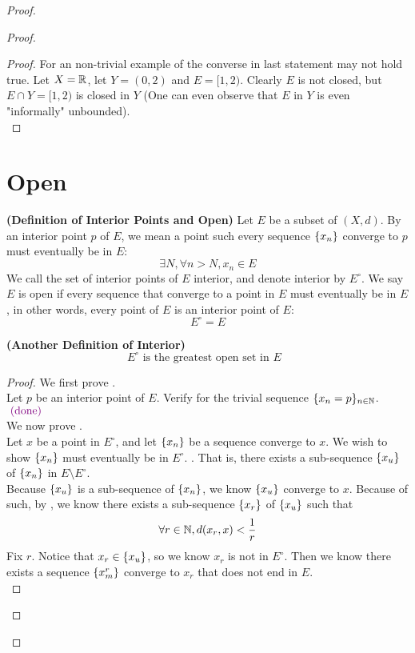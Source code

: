 \documentclass{report}
\begin{document}
\begin{proof}
\begin{proof}
\begin{proof}
For an non-trivial example of the converse in last statement may not hold true. Let $X=\mathbb{R}$, let $Y=(0,2)$ and $E=[1,2)$. Clearly $E$ is not closed, but  $E\cap Y=[1,2)$ is closed in $Y$ (One can even observe that $E$ in  $Y$ is even "informally" unbounded).\\
\end{proof}
\section{Open}
\begin{definition}
\label{3.3.1}
\textbf{(Definition of Interior Points and Open)} Let $E$ be a subset of $(X,d)$. By an interior point $p$ of $E$, we mean a point such every sequence  $\{ x_n \}$ converge to $p$ must eventually be in  $E$:
 \begin{equation}
\exists N, \forall n>N, x_n\in E
\end{equation}
We call the set of interior points of $E$  interior, and denote interior by  $E^\circ $. We say $E$ is open if every sequence that converge to a point in  $E$ must eventually be in  $E$, in other words, every point of $E$ is an interior point of $E$:
 \begin{equation}
E^\circ =E
\end{equation}
\end{definition}
\begin{theorem}
\label{3.3.2}
\textbf{(Another Definition of Interior)} 
\begin{equation}
E^\circ\text{ is the greatest open set in $E$ }
\end{equation}
\end{theorem}
\begin{proof}
We first prove .\\

Let $p$ be an interior point of $E$. Verify for the trivial sequence $\{ x_n=p \}_{n\in\mathbb{N}}$. $\textcolor{violet}{\text{ (done) }}$\\

We now prove .\\

Let $x$ be a point in $E^\circ $, and let $\{ x_n \}$ be a sequence converge to $x$. We wish to show  $\{ x_n \}$ must eventually be in $E^\circ $. . That is, there exists a sub-sequence $\{ x_u \}$ of $\{ x_n \}$ in $E\setminus E^\circ $.\\

Because $\{ x_u \}$ is a sub-sequence of $\{ x_n \}$, we know $\{ x_u \}$ converge to $x$. Because of such, by  , we know there exists a sub-sequence $\{ x_r \}$ of $\{ x_u \}$ such that
\begin{equation}
\forall r\in\mathbb{N}, d(x_r,x)<\frac{1}{r}
\end{equation}
Fix $r$. Notice that $x_r\in \{ x_u \}$, so we know $x_r$ is not in  $E^\circ $. Then we know there exists a sequence $\{ x^r_m \}$ converge to $x_r$ that does not end in $E$.\\


\end{proof}
\end{proof}
\end{proof}
\end{document}
